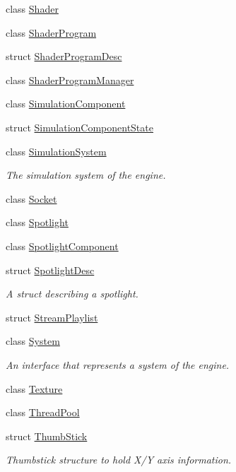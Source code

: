 \begin{DoxyCompactItemize}
\item 
class \hyperlink{class_blade_1_1_shader}{Shader}
\item 
class \hyperlink{class_blade_1_1_shader_program}{Shader\+Program}
\item 
struct \hyperlink{struct_blade_1_1_shader_program_desc}{Shader\+Program\+Desc}
\item 
class \hyperlink{class_blade_1_1_shader_program_manager}{Shader\+Program\+Manager}
\item 
class \hyperlink{class_blade_1_1_simulation_component}{Simulation\+Component}
\item 
struct \hyperlink{struct_blade_1_1_simulation_component_state}{Simulation\+Component\+State}
\item 
class \hyperlink{class_blade_1_1_simulation_system}{Simulation\+System}
\begin{DoxyCompactList}\small\item\em The simulation system of the engine. \end{DoxyCompactList}\item 
class \hyperlink{class_blade_1_1_socket}{Socket}
\item 
class \hyperlink{class_blade_1_1_spotlight}{Spotlight}
\item 
class \hyperlink{class_blade_1_1_spotlight_component}{Spotlight\+Component}
\item 
struct \hyperlink{struct_blade_1_1_spotlight_desc}{Spotlight\+Desc}
\begin{DoxyCompactList}\small\item\em A struct describing a spotlight. \end{DoxyCompactList}\item 
struct \hyperlink{struct_blade_1_1_stream_playlist}{Stream\+Playlist}
\item 
class \hyperlink{class_blade_1_1_system}{System}
\begin{DoxyCompactList}\small\item\em An interface that represents a system of the engine. \end{DoxyCompactList}\item 
class \hyperlink{class_blade_1_1_texture}{Texture}
\item 
class \hyperlink{class_blade_1_1_thread_pool}{Thread\+Pool}
\item 
struct \hyperlink{struct_blade_1_1_thumb_stick}{Thumb\+Stick}
\begin{DoxyCompactList}\small\item\em Thumbstick structure to hold X/Y axis information. \end{DoxyCompactList}\item 

\end{DoxyCompactItemize}
